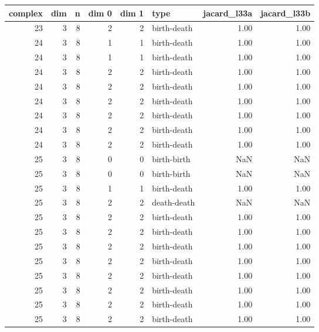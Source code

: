 \documentclass{article}
\begin{document}
\begin{center}
\begin{tabular}{rrrrrlrr}
\toprule
complex & dim & n & dim 0 & dim 1 & type & jacard\_l33a & jacard\_l33b \\
\midrule
23 & 3 & 8 & 2 & 2 & birth-death & 1.00 & 1.00 \\
24 & 3 & 8 & 1 & 1 & birth-death & 1.00 & 1.00 \\
24 & 3 & 8 & 1 & 1 & birth-death & 1.00 & 1.00 \\
24 & 3 & 8 & 2 & 2 & birth-death & 1.00 & 1.00 \\
24 & 3 & 8 & 2 & 2 & birth-death & 1.00 & 1.00 \\
24 & 3 & 8 & 2 & 2 & birth-death & 1.00 & 1.00 \\
24 & 3 & 8 & 2 & 2 & birth-death & 1.00 & 1.00 \\
24 & 3 & 8 & 2 & 2 & birth-death & 1.00 & 1.00 \\
24 & 3 & 8 & 2 & 2 & birth-death & 1.00 & 1.00 \\
25 & 3 & 8 & 0 & 0 & birth-birth & NaN & NaN \\
25 & 3 & 8 & 0 & 0 & birth-birth & NaN & NaN \\
25 & 3 & 8 & 1 & 1 & birth-death & 1.00 & 1.00 \\
25 & 3 & 8 & 2 & 2 & death-death & NaN & NaN \\
25 & 3 & 8 & 2 & 2 & birth-death & 1.00 & 1.00 \\
25 & 3 & 8 & 2 & 2 & birth-death & 1.00 & 1.00 \\
25 & 3 & 8 & 2 & 2 & birth-death & 1.00 & 1.00 \\
25 & 3 & 8 & 2 & 2 & birth-death & 1.00 & 1.00 \\
25 & 3 & 8 & 2 & 2 & birth-death & 1.00 & 1.00 \\
25 & 3 & 8 & 2 & 2 & birth-death & 1.00 & 1.00 \\
25 & 3 & 8 & 2 & 2 & birth-death & 1.00 & 1.00 \\
25 & 3 & 8 & 2 & 2 & birth-death & 1.00 & 1.00 \\
\bottomrule
\end{tabular}
\end{center}
\end{document}

